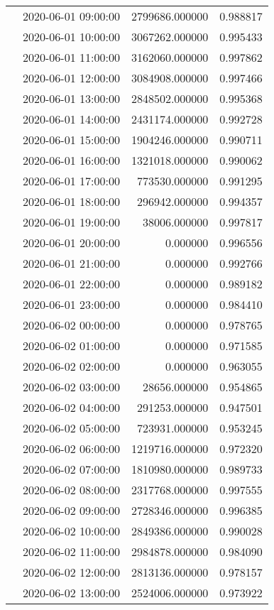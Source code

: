 \begin{tabular}{llrr}
 & 2020-06-01 09:00:00 & 2799686.000000 & 0.988817 \\
 & 2020-06-01 10:00:00 & 3067262.000000 & 0.995433 \\
 & 2020-06-01 11:00:00 & 3162060.000000 & 0.997862 \\
 & 2020-06-01 12:00:00 & 3084908.000000 & 0.997466 \\
 & 2020-06-01 13:00:00 & 2848502.000000 & 0.995368 \\
 & 2020-06-01 14:00:00 & 2431174.000000 & 0.992728 \\
 & 2020-06-01 15:00:00 & 1904246.000000 & 0.990711 \\
 & 2020-06-01 16:00:00 & 1321018.000000 & 0.990062 \\
 & 2020-06-01 17:00:00 & 773530.000000 & 0.991295 \\
 & 2020-06-01 18:00:00 & 296942.000000 & 0.994357 \\
 & 2020-06-01 19:00:00 & 38006.000000 & 0.997817 \\
 & 2020-06-01 20:00:00 & 0.000000 & 0.996556 \\
 & 2020-06-01 21:00:00 & 0.000000 & 0.992766 \\
 & 2020-06-01 22:00:00 & 0.000000 & 0.989182 \\
 & 2020-06-01 23:00:00 & 0.000000 & 0.984410 \\
 & 2020-06-02 00:00:00 & 0.000000 & 0.978765 \\
 & 2020-06-02 01:00:00 & 0.000000 & 0.971585 \\
 & 2020-06-02 02:00:00 & 0.000000 & 0.963055 \\
 & 2020-06-02 03:00:00 & 28656.000000 & 0.954865 \\
 & 2020-06-02 04:00:00 & 291253.000000 & 0.947501 \\
 & 2020-06-02 05:00:00 & 723931.000000 & 0.953245 \\
 & 2020-06-02 06:00:00 & 1219716.000000 & 0.972320 \\
 & 2020-06-02 07:00:00 & 1810980.000000 & 0.989733 \\
 & 2020-06-02 08:00:00 & 2317768.000000 & 0.997555 \\
 & 2020-06-02 09:00:00 & 2728346.000000 & 0.996385 \\
 & 2020-06-02 10:00:00 & 2849386.000000 & 0.990028 \\
 & 2020-06-02 11:00:00 & 2984878.000000 & 0.984090 \\
 & 2020-06-02 12:00:00 & 2813136.000000 & 0.978157 \\
 & 2020-06-02 13:00:00 & 2524006.000000 & 0.973922 \\

\end{tabular}

